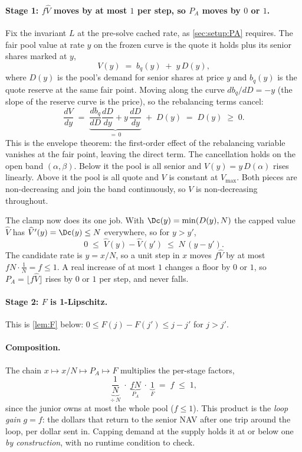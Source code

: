 \paragraph{Stage 1: $f\widehat{V}$ moves by at most $1$ per step, so $P_A$ moves by $0$ or $1$.}
Fix the invariant $L$ at the pre-solve cached rate, as
\cref{sec:setup:PA} requires. The fair pool value at rate $y$ on the
frozen curve is the quote it holds plus its senior shares marked at $y$,
\[
  V(y) \;=\; b_q(y) \;+\; y\,D(y),
\]
where $D(y)$ is the pool's demand for senior shares at price $y$ and
$b_q(y)$ is the quote reserve at the same fair point. Moving along the
curve $db_q/dD = -y$ (the slope of the reserve curve is the price), so
the rebalancing terms cancel:
\[
  \frac{dV}{dy}
    \;=\; \underbrace{\frac{db_q}{dD}\frac{dD}{dy} + y\,\frac{dD}{dy}}_{=\,0}
       \;+\; D(y)
    \;=\; D(y) \;\geq\; 0.
\]
This is the envelope theorem: the first-order effect of the rebalancing
variable vanishes at the fair point, leaving the direct term. The
cancellation holds on the open band $(\alpha, \beta)$. Below it the pool
is all senior and $V(y) = y\,D(\alpha)$ rises linearly. Above it the
pool is all quote and $V$ is constant at $V_{\max}$. Both pieces are
non-decreasing and join the band continuously, so $V$ is non-decreasing
throughout.

The clamp now does its one job. With $\Dc(y) = \min(D(y), N)$ the
capped value $\widehat{V}$ has $\widehat{V}'(y) = \Dc(y) \leq N$
everywhere, so for $y > y'$,
\[
  0 \;\leq\; \widehat{V}(y) - \widehat{V}(y') \;\leq\; N\,(y - y').
\]
The candidate rate is $y = x/N$, so a unit step in $x$ moves
$f\widehat{V}$ by at most $f N \cdot \tfrac1N = f \leq 1$. A real
increase of at most $1$ changes a floor by $0$ or $1$, so
$P_A = \lfloor f \widehat{V}\rfloor$ rises by $0$ or $1$ per step, and
never falls.

\paragraph{Stage 2: $F$ is 1-Lipschitz.}
This is \cref{lem:F} below: $0 \leq F(j) - F(j') \leq j - j'$ for
$j > j'$.

\paragraph{Composition.}
The chain $x \mapsto x/N \mapsto P_A \mapsto F$ multiplies the per-stage
factors,
\[
  \underbrace{\frac{1}{N}}_{\div\, N}
  \;\cdot\;
  \underbrace{f N}_{P_A}
  \;\cdot\;
  \underbrace{1}_{F}
  \;=\; f \;\leq\; 1,
\]
since the junior owns at most the whole pool ($f \leq 1$). This product
is the \emph{loop gain} $g = f$: the dollars that return to the senior
NAV after one trip around the loop, per dollar sent in. Capping demand
at the supply holds it at or below one \emph{by construction}, with no
runtime condition to check.

